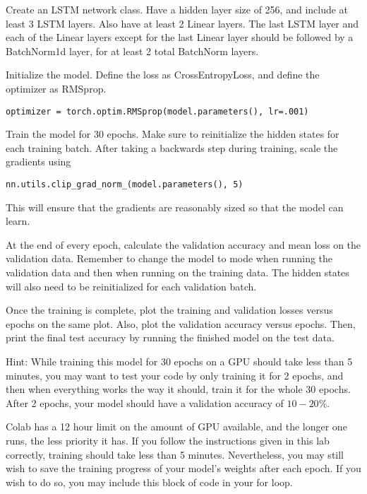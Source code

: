 \begin{problem}
Create an LSTM network class.
Have a hidden layer size of 256, and include at least 3 LSTM layers.
Also have at least 2 Linear layers.
The last LSTM layer and each of the Linear layers except for the last Linear layer should be followed by a BatchNorm1d layer, for at least 2 total BatchNorm layers.

Initialize the model.
Define the loss as CrossEntropyLoss, and define the optimizer as RMSprop.
\begin{lstlisting}
optimizer = torch.optim.RMSprop(model.parameters(), lr=.001)
\end{lstlisting}

Train the model for 30 epochs.
Make sure to reinitialize the hidden states  for each training batch.
After taking a backwards step during training, scale the gradients using
\begin{lstlisting}
nn.utils.clip_grad_norm_(model.parameters(), 5)
\end{lstlisting}
This will ensure that the gradients are reasonably sized so that the model can learn.

At the end of every epoch, calculate the validation accuracy and mean loss on the validation data.
Remember to change the model to  mode when running the validation data and then  when running on the training data.
The hidden states  will also need to be reinitialized for each validation batch.

Once the training is complete, plot the training and validation losses versus epochs on the same plot.
Also, plot the validation accuracy versus epochs.
Then, print the final test accuracy by running the finished model on the test data.

Hint: While training this model for 30 epochs on a GPU should take less than 5 minutes, you may want to test your code by only training it for 2 epochs, and then when everything works the way it should, train it for the whole 30 epochs.
After 2 epochs, your model should have a validation accuracy of $10-20\%$.

\begin{warn}
Colab has a 12 hour limit on the amount of GPU available, and the longer one runs, the less priority it has.
If you follow the instructions given in this lab correctly, training should take less than 5 minutes.
Nevertheless, you may still wish to save the training progress of your model's weights after each epoch.
If you wish to do so, you may include this block of code in your for loop.


\end{warn}
\end{problem}
